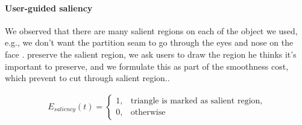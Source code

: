 \paragraph{User-guided saliency} 
We observed that there are many salient regions on each of the object we used, e.g., we don't want the partition seam to go through the eyes and nose on the face .
 preserve the salient region, we ask users to draw the region he thinks it's important to preserve, and we formulate this as part of the smoothness cost, which prevent  to cut through salient region\chireplace{~\figname~\ref{fig:saliency}}{(~\figname~\ref{fig:saliency})}..

\begin{align}
E_{saliency}(t) = 
\begin{cases}
1, & \text{triangle is marked as salient region}, \\
0, & \text{otherwise} 
\end{cases}
\end{align}

